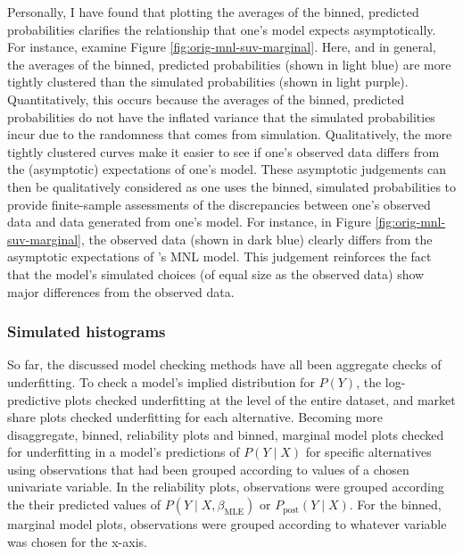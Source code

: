\documentclass[preprint]{elsarticle}
\begin{document}
Personally, I have found that plotting the averages of the binned, predicted probabilities clarifies the relationship that one's model expects asymptotically. For instance, examine Figure \ref{fig:orig-mnl-suv-marginal}. Here, and in general, the averages of the binned, predicted probabilities (shown in light blue) are more tightly clustered than the simulated probabilities (shown in light purple). Quantitatively, this occurs because the averages of the binned, predicted probabilities do not have the inflated variance that the simulated probabilities incur due to the randomness that comes from simulation. Qualitatively, the more tightly clustered curves make it easier to see if one's observed data differs from the (asymptotic) expectations of one's model. These asymptotic judgements can then be qualitatively considered as one uses the binned, simulated probabilities to provide finite-sample assessments of the discrepancies between one's observed data and data generated from one's model. For instance, in Figure \ref{fig:orig-mnl-suv-marginal}, the observed data (shown in dark blue) clearly differs from the asymptotic expectations of \citeauthor{brownstone_forecasting_1998}'s MNL model. This judgement reinforces the fact that the model's simulated choices (of equal size as the observed data) show major differences from the observed data.

\subsubsection{Simulated histograms}
\label{sec:case1-part1-histograms}
So far, the discussed model checking methods have all been aggregate checks of underfitting. To check a model's implied distribution for $P \left( Y \right)$, the log-predictive plots checked underfitting at the level of the entire dataset, and market share plots checked underfitting for each alternative. Becoming more disaggregate, binned, reliability plots and binned, marginal model plots checked for underfitting in a model's predictions of $P \left( Y \mid X \right)$ for specific alternatives using observations that had been grouped according to values of a chosen univariate variable. In the reliability plots, observations were grouped according the their predicted values of $P \left( Y \mid X, \beta _{\textrm{MLE}} \right)$ or $P_{\textrm{post}} \left( Y \mid X \right)$. For the binned, marginal model plots, observations were grouped according to whatever variable was chosen for the x-axis.
\end{document}
